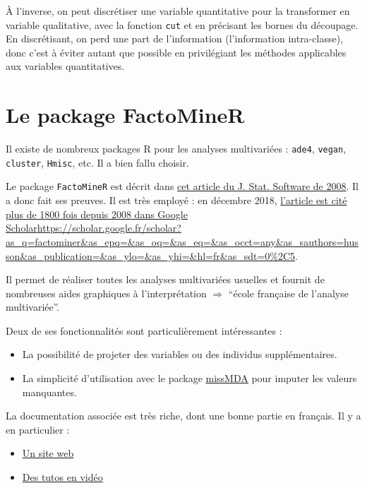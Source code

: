 \documentclass[]{book}
\providecommand{\tightlist}{%
  \setlength{\itemsep}{0pt}\setlength{\parskip}{0pt}}
\begin{document}
À l'inverse, on peut discrétiser une variable quantitative pour la transformer en variable qualitative, avec la fonction \texttt{cut} et en précisant les bornes du découpage. En discrétisant, on perd une part de l'information (l'information intra-classe), donc c'est à éviter autant que possible en privilégiant les méthodes applicables aux variables quantitatives.

\hypertarget{le-package-factominer}{%
\section{Le package FactoMineR}\label{le-package-factominer}}

Il existe de nombreux packages R pour les analyses multivariées : \texttt{ade4}, \texttt{vegan}, \texttt{cluster}, \texttt{Hmisc}, etc. Il a bien fallu choisir.

Le package \texttt{FactoMineR} est décrit dans \href{https://www.jstatsoft.org/index.php/jss/article/view/v025i01/v25i01.pdf}{cet article du J. Stat. Software de 2008}. Il a donc fait ses preuves. Il est très employé : en décembre 2018, \href{}{l'article est cité plus de 1800 fois depuis 2008 dans Google Scholar}\url{https://scholar.google.fr/scholar?as_q=factominer\&as_epq=\&as_oq=\&as_eq=\&as_occt=any\&as_sauthors=husson\&as_publication=\&as_ylo=\&as_yhi=\&hl=fr\&as_sdt=0\%2C5}.

Il permet de réaliser toutes les analyses multivariées usuelles et fournit de nombreuses aides graphiques à l'interprétation \(\Rightarrow\) ``école française de l'analyse multivariée''.

Deux de ses fonctionnalités sont particulièrement intéressantes :

\begin{itemize}
\tightlist
\item
  La possibilité de projeter des variables ou des individus supplémentaires.
\item
  La simplicité d'utilisation avec le package \href{http://math.agrocampus-ouest.fr/infoglueDeliverLive/developpement/missMDA}{missMDA} pour imputer les valeurs manquantes.
\end{itemize}

La documentation associée est très riche, dont une bonne partie en français. Il y a en particulier :

\begin{itemize}
\tightlist
\item
  \href{http://factominer.free.fr/}{Un site web}
\item
  \href{https://www.youtube.com/playlist?list=PLnZgp6epRBbTsZEFXi_p6W48HhNyqwxIu}{Des tutos en vidéo}
\end{itemize}
\end{document}
